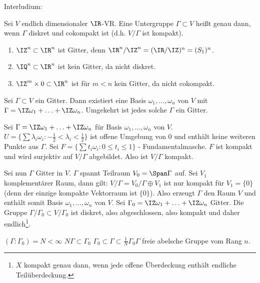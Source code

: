    Interludium:   
   \begin{Definition}
    Sei $V$ endlich dimensionaler $\IR$-VR. Eine Untergruppe $\Gamma\subset V$ heißt  genau dann, wenn $\Gamma$ diskret und cokompakt ist (d.h. $V/\Gamma$ ist kompakt).
   \end{Definition}

   \begin{Beispiel}
   \begin{enumerate}
    \item $\IZ^n\subset\IR^n$ ist Gitter, denn $\IR^n/\IZ^n=(\IR/\IZ)^n=(S_1)^n$.
    \item $\IQ^n\subset\IR^n$ ist kein Gitter, da nicht diskret.
    \item $\IZ^m\times 0 \subset \IR^n$ ist für $m<n$ kein Gitter, da nicht cokompakt.
   \end{enumerate}
   \end{Beispiel}

   \begin{Fakt}
    Sei $\Gamma\subset V$ ein Gitter. Dann existiert eine Basis $\omega_1,\ldots,\omega_n$ von $V$ mit $\Gamma= \IZ\omega_1 + \ldots + \IZ\omega_n$. Umgekehrt ist jedes solche $\Gamma$ ein Gitter.
   \end{Fakt}
   
   \begin{Beweis}
    Sei $\Gamma=\IZ\omega_1+ \ldots +\IZ\omega_n$ für Basis $\omega_1,\ldots,\omega_n$ von $V$.
     $U=\{ \sum\lambda_i\omega_i : -\frac{1}{2}< \lambda_i < \frac{1}{2}\}$ ist offene Umgebung von $0$ und enthält keine weiteren Punkte aus $\Gamma$.
    Sei $F=\{ \sum t_i\omega_i: 0\leq t_i\leq 1\}$ - Fundamentalmasche. $F$ ist kompakt und wird surjektiv auf $V/\Gamma$ abgebildet. Also ist $V/\Gamma$ kompakt. 
    
    Sei nun $\Gamma$ Gitter in $V$. $\Gamma$ spannt Teilraum $V_0=\Span\Gamma$ auf. Sei $V_1$ komplementärer Raum, dann gilt: $V/\Gamma=V_0/\Gamma\oplus V_1$ ist nur kompakt für $V_1=\{0\}$ (denn der einzige kompakte Vektorraum ist $\{0\}$). Also erzeugt $\Gamma$ den Raum $V$ und enthält somit Basis $\omega_1,\ldots,\omega_n$ von $V$. Sei $\Gamma_0=\IZ\omega_1+\ldots+\IZ\omega_n$ Gitter. Die Gruppe $\Gamma/\Gamma_0\subset V/\Gamma_0$ ist diskret, also abgeschlossen, also kompakt und daher endlich\footnote{$X$ kompakt genau dann, wenn jede offene Überdeckung enthält endliche Teilüberdeckung.}.
    
    \folge $(\Gamma:\Gamma_0)=N<\infty$ \folge $N\Gamma\subset \Gamma_0$ \folge $\Gamma_0\subset\Gamma\subset\frac{1}{N}\Gamma_0$\folge $\Gamma$ freie abelsche Gruppe vom Rang $n$.
   \end{Beweis}

